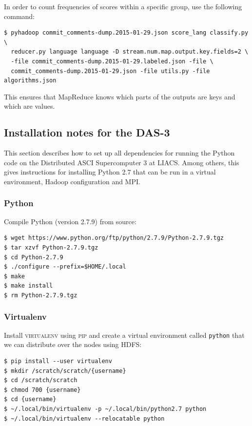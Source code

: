 \documentclass{article}
\begin{document}
In order to count frequencies of scores within a specific group, use the 
following command:

\begin{verbatim}
$ pyhadoop commit_comments-dump.2015-01-29.json score_lang classify.py \
  reducer.py language language -D stream.num.map.output.key.fields=2 \
  -file commit_comments-dump.2015-01-29.labeled.json -file \
  commit_comments-dump.2015-01-29.json -file utils.py -file algorithms.json
\end{verbatim}

This ensures that MapReduce knows which parts of the outputs are keys and which 
are values.

\subsection{Installation notes for the DAS-3}\label{app:installation-notes}
This section describes how to set up all dependencies for running the Python
code on the Distributed ASCI Supercomputer 3 at LIACS\@. Among others, this
gives instructions for installing Python 2.7 that can be run in a virtual
environment, Hadoop configuration and MPI.

\subsubsection{Python}\label{app:python}
Compile Python (version 2.7.9) from source:

\begin{verbatim}
$ wget https://www.python.org/ftp/python/2.7.9/Python-2.7.9.tgz
$ tar xzvf Python-2.7.9.tgz
$ cd Python-2.7.9
$ ./configure --prefix=$HOME/.local
$ make
$ make install
$ rm Python-2.7.9.tgz
\end{verbatim}

\subsubsection{Virtualenv}\label{app:virtualenv}

Install \textsc{virtualenv} using \textsc{pip} and create a virtual environment 
called \texttt{python} that we can distribute over the nodes using HDFS:

\begin{verbatim}
$ pip install --user virtualenv
$ mkdir /scratch/scratch/{username}
$ cd /scratch/scratch
$ chmod 700 {username}
$ cd {username}
$ ~/.local/bin/virtualenv -p ~/.local/bin/python2.7 python
$ ~/.local/bin/virtualenv --relocatable python
\end{verbatim}
\end{document}
